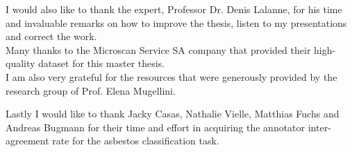\documentclass[11pt,a4paper,twoside,hidelinks,openright]{rvsmaster}
\makeatletter
\def\cleardoublepage{\clearpage\if@twoside \ifodd\c@page\else
	\hbox{}
	\thispagestyle{empty}
	\newpage
\fi\fi}
\makeatother
\begin{document}
I would also like to thank the expert, Professor Dr. Denis Lalanne, for his time and invaluable remarks on how to improve the thesis, listen to my presentations and correct the work. \\


Many thanks to the Microscan Service SA company that provided their high-quality dataset for this master thesis.\\


I am also very grateful for the resources that were generously provided by the research group of Prof. Elena Mugellini.


Lastly I would like to thank Jacky Casas, Nathalie Vielle, Matthias Fuchs and Andreas Bugmann for their time and effort in acquiring the annotator inter-agreement rate for the asbestos classification task.

\cleardoublepage
\setcounter{page}{1}	%













\end{document}
